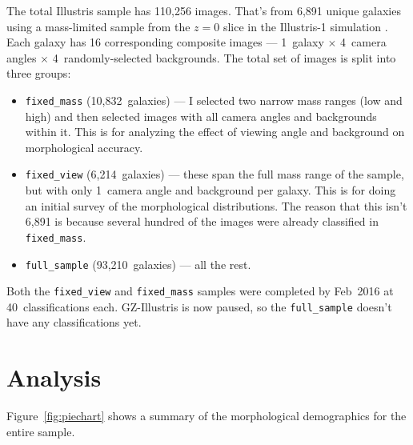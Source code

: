 \documentclass[iop,apj,tighten]{emulateapj}
\begin{document}
The total Illustris sample has 110,256 images. That's from 6,891 unique galaxies using a mass-limited sample from the $z=0$ slice in the Illustris-1 simulation \citep{vog14a}. Each galaxy has 16 corresponding composite images --- 1~galaxy $\times$ 4~camera angles $\times$ 4~randomly-selected backgrounds. The total set of images is split into three groups:

\begin{itemize}

\item {\tt fixed\_mass} (10,832~galaxies) --- I selected two narrow mass ranges (low and high) and then selected images with all camera angles and backgrounds within it. This is for analyzing the effect of viewing angle and background on morphological accuracy.
\item {\tt fixed\_view} (6,214~galaxies) --- these span the full mass range of the sample, but with only 1~camera angle and background per galaxy. This is for doing an initial survey of the morphological distributions. The reason that this isn't 6,891 is because several hundred of the images were already classified in {\tt fixed\_mass}.
\item {\tt full\_sample} (93,210~galaxies) --- all the rest.

\end{itemize}


Both the {\tt fixed\_view} and {\tt fixed\_mass} samples were completed by Feb~2016 at 40~classifications each. GZ-Illustris is now paused, so the {\tt full\_sample} doesn't have any classifications yet. 

\section{Analysis}

Figure~\ref{fig:piechart} shows a summary of the morphological demographics for the entire sample. 
\end{document}
